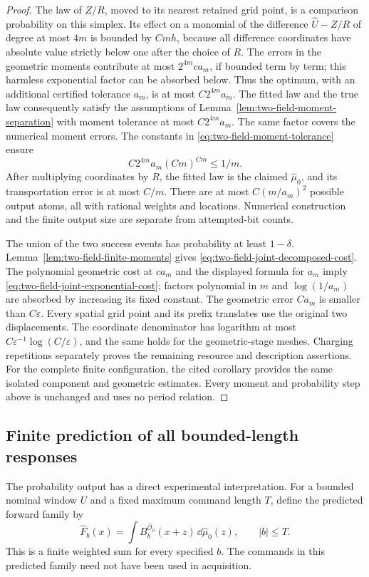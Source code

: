 \begin{proof}
The law of $Z/R$, moved to its nearest retained grid point, is a
comparison probability on this simplex.  Its effect on a monomial
of the difference $\widehat U-Z/R$ of degree at most $4m$ is bounded
by $Cmh$, because all difference coordinates have absolute value
strictly below one after the choice of $R$.  The errors in the
geometric moments contribute at most $2^{4m}c a_m$, if bounded
term by term; this harmless exponential factor can be absorbed
below.  Thus the optimum, with an additional certified tolerance
$a_m$, is at most $C2^{4m}a_m$.
The fitted law and the true law consequently satisfy the assumptions
of Lemma~\ref{lem:two-field-moment-separation} with moment tolerance
at most $C2^{4m}a_m$.  The same factor covers the numerical moment
errors.  The constants in \eqref{eq:two-field-moment-tolerance}
ensure
\[
                  C2^{4m}a_m(Cm)^{Cm}\le 1/m.
\]
After multiplying coordinates by $R$, the fitted law is the claimed
$\widehat\mu_0$, and its transportation error is at most $C/m$.
There are at most $C(m/a_m)^2$ possible output atoms, all with
rational weights and locations.  Numerical construction and the
finite output size are separate from attempted-bit counts.

The union of the two success events has probability at least
$1-\delta$.  Lemma~\ref{lem:two-field-finite-moments} gives
\eqref{eq:two-field-joint-decomposed-cost}.  The polynomial geometric
cost at $c a_m$ and the displayed formula for $a_m$ imply
\eqref{eq:two-field-joint-exponential-cost}; factors polynomial in
$m$ and $\log(1/a_m)$ are absorbed by increasing its fixed constant.
The geometric error $Ca_m$ is smaller than $C\varepsilon$.
Every spatial grid point and its prefix translates use the original
two displacements.  The coordinate denominator has logarithm at
most $C\varepsilon^{-1}\log(C/\varepsilon)$, and the same holds
for the geometric-stage meshes.  Charging repetitions separately
proves the remaining resource and description assertions.  For the
complete finite configuration, the cited corollary provides the same
isolated component and geometric estimates.  Every moment and
probability step above is unchanged and uses no period relation.
\end{proof}

\subsection{Finite prediction of all bounded-length responses}
The probability output has a direct experimental interpretation.
For a bounded nominal window $U$ and a fixed maximum command length
$T$, define the predicted forward family by
\begin{equation}\label{eq:two-field-predicted-family}
 \widehat F_b(x)=\int B_b^{\widehat{\mathcal O}_0}(x+z)
                                      \,\dd\widehat\mu_0(z),
                                  \qquad |b|\le T.
\end{equation}
This is a finite weighted sum for every specified $b$.  The commands
in this predicted family need not have been used in acquisition.

